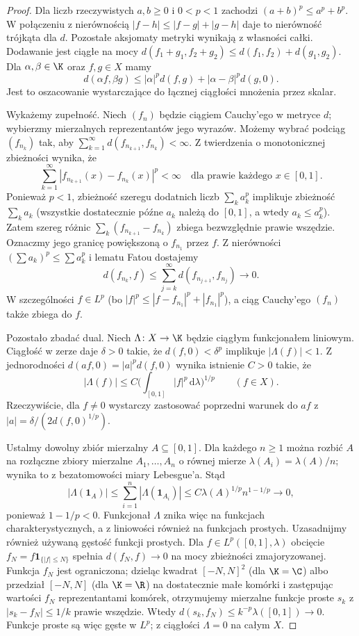 \begin{proof}
Dla liczb rzeczywistych $a,b\geq0$ i $0<p<1$ zachodzi
$(a+b)^p\leq a^p+b^p$. W połączeniu z nierównością
$|f-h|\leq|f-g|+|g-h|$ daje to nierówność trójkąta dla $d$.
Pozostałe aksjomaty metryki wynikają z własności całki.
Dodawanie jest ciągłe na mocy
$d(f_1+g_1,f_2+g_2)\leq d(f_1,f_2)+d(g_1,g_2)$.
Dla $\alpha,\beta\in\K$ oraz $f,g\in X$ mamy
\[
 d(\alpha f,\beta g)
 \leq |\alpha|^p d(f,g)+|\alpha-\beta|^p d(g,0).
\]
Jest to oszacowanie wystarczające do łącznej ciągłości
mnożenia przez skalar.

Wykażemy zupełność. Niech $(f_n)$ będzie ciągiem Cauchy'ego
w metryce $d$; wybierzmy mierzalnych reprezentantów jego wyrazów.
Możemy wybrać podciąg $(f_{n_k})$ tak, aby
$\sum_{k=1}^\infty d(f_{n_{k+1}},f_{n_k})<\infty$.
Z twierdzenia o monotonicznej zbieżności wynika, że
\[
 \sum_{k=1}^\infty|f_{n_{k+1}}(x)-f_{n_k}(x)|^p<\infty
 \quad\text{dla prawie każdego }x\in[0,1].
\]
Ponieważ $p<1$, zbieżność szeregu dodatnich liczb
$\sum_k a_k^p$ implikuje zbieżność $\sum_k a_k$
(wszystkie dostatecznie późne $a_k$ należą do $[0,1]$,
a wtedy $a_k\leq a_k^p$). Zatem szereg różnic
$\sum_k(f_{n_{k+1}}-f_{n_k})$ zbiega bezwzględnie
prawie wszędzie. Oznaczmy jego granicę powiększoną o
$f_{n_1}$ przez $f$. Z nierówności $(\sum a_k)^p\leq\sum a_k^p$
i lematu Fatou dostajemy
\[
 d(f_{n_k},f)
 \leq \sum_{j=k}^\infty d(f_{n_{j+1}},f_{n_j})\longrightarrow0.
\]
W szczególności $f\in L^p$ (bo $|f|^p\leq|f-f_{n_1}|^p+|f_{n_1}|^p$),
a ciąg Cauchy'ego $(f_n)$ także zbiega do $f$.

Pozostało zbadać dual. Niech $\Lambda\colon X\to\K$
będzie ciągłym funkcjonałem liniowym. Ciągłość w zerze
daje $\delta>0$ takie, że
$d(f,0)<\delta^p$ implikuje $|\Lambda(f)|<1$.
Z jednorodności $d(af,0)=|a|^p d(f,0)$ wynika istnienie
$C>0$ takie, że
\[
 |\Lambda(f)|\leq C\Big(\int_{[0,1]}|f|^p\,\mathrm d\lambda\Big)^{1/p}
 \qquad(f\in X).
\]
Rzeczywiście, dla $f\ne0$ wystarczy zastosować poprzedni
warunek do $a f$ z $|a|=\delta/(2d(f,0)^{1/p})$.

Ustalmy dowolny zbiór mierzalny $A\subseteq[0,1]$.
Dla każdego $n\geq1$ można rozbić $A$ na rozłączne
zbiory mierzalne $A_1,\ldots,A_n$ o równej mierze
$\lambda(A_i)=\lambda(A)/n$; wynika to z bezatomowości
miary Lebesgue'a. Stąd
\[
 |\Lambda(\mathbf1_A)|
 \leq\sum_{i=1}^n|\Lambda(\mathbf1_{A_i})|
 \leq C\lambda(A)^{1/p}n^{1-1/p}\longrightarrow0,
\]
ponieważ $1-1/p<0$. Funkcjonał $\Lambda$ znika więc
na funkcjach charakterystycznych, a z liniowości również
na funkcjach prostych. Uzasadnijmy również używaną gęstość funkcji prostych.
Dla $f\in L^p([0,1],\lambda)$ obcięcie
$f_N=f\mathbf1_{\{|f|\leq N\}}$ spełnia
$d(f_N,f)\to0$ na mocy zbieżności zmajoryzowanej.
Funkcja $f_N$ jest ograniczona; dzieląc kwadrat
$[-N,N]^2$ (dla $\K=\C$) albo przedział $[-N,N]$
(dla $\K=\R$) na dostatecznie małe komórki i zastępując
wartości $f_N$ reprezentantami komórek, otrzymujemy
mierzalne funkcje proste $s_k$ z
$|s_k-f_N|\leq1/k$ prawie wszędzie. Wtedy
$d(s_k,f_N)\leq k^{-p}\lambda([0,1])\to0$.
Funkcje proste są więc gęste w $L^p$; z ciągłości
$\Lambda=0$ na całym $X$.
\end{proof}

